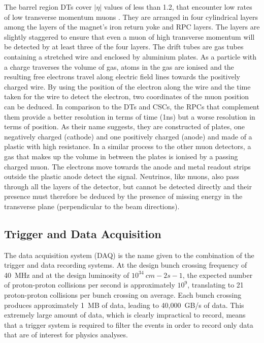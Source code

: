 The barrel region DTs cover $|\eta|$ values of less than 1.2, that encounter low rates of low transverse
momentum muons \cite{CMS_TDR1}. They are arranged in four cylindrical layers among the layers of the magnet's iron return
yoke and RPC layers. The layers are slightly staggered to ensure that even a muon of high transverse momentum
will be detected by at least three of the four layers. The drift tubes are gas tubes containing a stretched
wire and enclosed by aluminium plates. As a particle with a charge traverses the volume of gas, atoms in the
gas are ionised and the resulting free electrons travel along electric field lines towards the positively
charged wire. By using the position of the electron along the wire and the time taken for the wire to detect
the electron, two coordinates of the muon position can be deduced.
In comparison to the DTs and CSCs, the RPCs that complement them provide a better resolution in terms of time
(1ns) but a worse resolution in terms of position. As their name suggests, they are constructed of plates, one
negatively charged (cathode) and one positively charged (anode) and made of a plastic with high resistance. In
a similar process to the other muon detectors, a gas that makes up the volume in between the plates is ionised
by a passing charged muon. The electrons move towards the anode and metal readout strips outside the plastic
anode detect the signal.
Neutrinos, like muons, also pass through all the layers of the detector, but cannot be detected directly and
their presence must therefore be deduced by the presence of missing energy in the transverse plane
(perpendicular to the beam directions).

\subsection{Trigger and Data Acquisition}
\label{ss:Trigger}
The data acquisition system (DAQ) is the name given to the combination of the trigger and data recording
systems. At the design bunch crossing frequency of 40~MHz and at the design luminosity of $10^{34}~cm-2s-1$,
the expected number of proton-proton collisions per second is approximately $10^{9}$, translating to 21
proton-proton collisions per bunch crossing on average. Each bunch crossing produces approximately 1~MB of
data, leading to 40,000~GB/s of data. This extremely large amount of data, which is clearly impractical to
record, means that a trigger system is required to filter the events in order to record only data that are of
interest for physics analyses.

